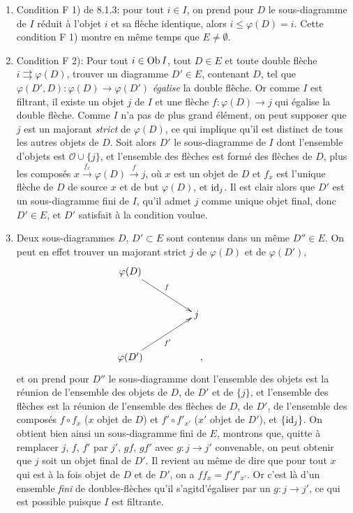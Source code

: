 \documentclass[10pt]{../fichiers-configuration-latex/smfart}
\def\labelenumi{(\theenumi)}
\begin{document}
\begin{enumerate}
\renewcommand{\labelenumi}{\theenumi)}
\item Condition F 1) de 8.1.3: pour tout $i\in I$, on prend pour $D$
  le sous-diagramme de $I$ réduit à l'objet $i$ et sa flèche
  identique, alors $i\leq \varphi(D)=i$. Cette condition F 1) montre
  en même temps que $E\neq ∅$.

\item Condition F 2): Pour tout $i\in \operatorname{Ob} I$, tout $D\in E$ et toute
  double flèche $i\rightrightarrows \varphi(D)$, trouver un
  diagramme $D'\in E$, contenant $D$, tel que
  $\varphi(D',D):\varphi(D)\rightarrow \varphi(D')$ \emph{égalise}
  la double flèche. Or comme $I$ est filtrant, il\pageoriginale
  existe un objet $j$ de $I$ et une flèche
$f:\varphi(D)\rightarrow j$ qui égalise la double flèche. Comme $I$
n'a pas de plus grand élément, on peut supposer que $j$ est un
majorant \emph{strict} de $\varphi(D)$, ce qui implique qu'il est
distinct de tous les autres objets de $D$. Soit alors $D'$ le
sous-diagramme de $I$ dont l'ensemble d'objets est
$\mathcal{O}\cup\{j\}$, et l'ensemble des flèches est formé des
flèches de $D$, plus les composés
$x\xrightarrow{f_x}\varphi(D)\xrightarrow{f}j$, où $x$ est un objet
de $D$ et $f_x$ est l'unique flèche de $D$ de source $x$ et de but
$\varphi(D)$, et $\operatorname{id}_j$. Il est clair alors que $D'$ est un
sous-diagramme fini de $I$, qu'il admet $j$ comme unique objet
final, donc $D'\in E$, et $D'$ satisfait à la condition voulue.

\renewcommand{\labelenumi}{$3^\circ$}
\item Deux sous-diagrammes $D$, $D'\subset E$ sont contenus dans un
  même $D''\in E$. On peut en effet trouver un majorant strict $j$
  de $\varphi(D)$ et de $\varphi(D')$,
\[
\xymatrix@C=1.5cm@R=1cm{
\varphi(D)\ar[rd]^f && \\
           &j &\\
\varphi(D')\ar[ru]_{f'}&\quad , }
\]
et on prend pour $D''$ le sous-diagramme dont l'ensemble des objets
est la réunion de l'ensemble des objets de $D$, de $D'$ et de
$\{j\}$, et l'ensemble des flèches est la réunion de l'ensemble des
flèches de $D$, de $D'$, de l'ensemble des composés $f\circ f_x$
($x$ objet de $D$) et $f'\circ f'_{x'}$ ($x'$ objet de $D'$), et
$\{\operatorname{id}_j\}$. On obtient bien ainsi un sous-diagramme fini de $E$,
montrons que, quitte à remplacer $j$, $f$, $f'$ par $j'$, $gf$,
$gf'$ avec $g:j\rightarrow j'$ convenable, on peut obtenir que $j$
soit un objet final de $D'$. Il revient au même de dire que pour
tout $x$ qui est à la fois objet de $D$ et de $D'$, on a
$ff_x=f'f'_{x'}$. Or c'est là d'un ensemble \emph{fini} de
doubles-flèches qu'il s'agit\pageoriginale d'égaliser par un
$g:j\rightarrow j'$, ce qui est possible puisque $I$ est filtrante.
\end{enumerate}
\end{document}
